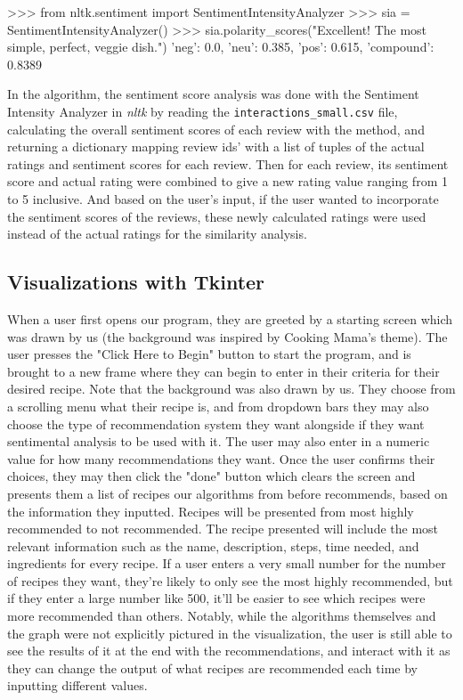 \documentclass[fontsize=11pt]{article}
\begin{document}
\begin{python}
>>> from nltk.sentiment import SentimentIntensityAnalyzer
>>> sia = SentimentIntensityAnalyzer()
>>> sia.polarity_scores("Excellent!  The most simple, perfect, veggie dish.")
{'neg': 0.0, 'neu': 0.385, 'pos': 0.615, 'compound': 0.8389}
\end{python}

In the algorithm, the sentiment score analysis was done with the Sentiment Intensity Analyzer in {\em nltk} by reading the \texttt{interactions\_small.csv} file, calculating the overall sentiment scores of each review with the  method, and returning a dictionary mapping review ids' with a list of tuples of the actual ratings and sentiment scores for each review. Then for each review, its sentiment score and actual rating were combined to give a new rating value ranging from 1 to 5 inclusive. And based on the user's input, if the user wanted to incorporate the sentiment scores of the reviews, these newly calculated ratings were used instead of the actual ratings for the similarity analysis.

\subsection{Visualizations with Tkinter}
When a user first opens our program, they are greeted by a starting screen which was drawn by us (the background was inspired by Cooking Mama's theme). The user presses the "Click Here to Begin" button to start the program, and is brought to a new frame where they can begin to enter in their criteria for their desired recipe. Note that the background was also drawn by us. They choose from a scrolling menu what their recipe is, and from dropdown bars they may also choose the type of recommendation system they want alongside if they want sentimental analysis to be used with it. The user may also enter in a numeric value for how many recommendations they want. Once the user confirms their choices, they may then click the "done" button which clears the screen and presents them a list of recipes our algorithms from before recommends, based on the information they inputted. Recipes will be presented from most highly recommended to not recommended. The recipe presented will include the most relevant information such as the name, description, steps, time needed, and ingredients for every recipe. If a user enters a very small number for the number of recipes they want, they're likely to only see the most highly recommended, but if they enter a large number like 500, it'll be easier to see which recipes were more recommended than others. Notably, while the algorithms themselves and the graph were not explicitly pictured in the visualization, the user is still able to see the results of it at the end with the recommendations, and interact with it as they can change the output of what recipes are recommended each time by inputting different values. \newline
\end{document}

